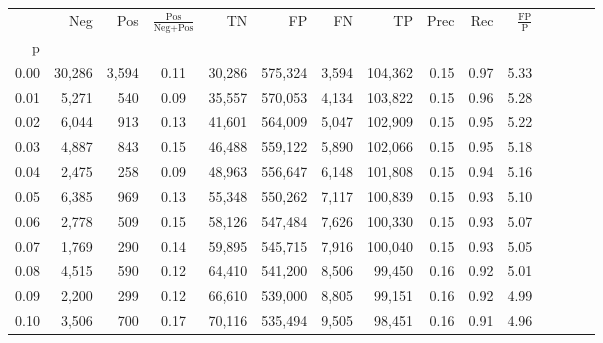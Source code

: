 \begin{tabular}{rrrcrrrrrrrrrrr}
\toprule
{} &     Neg &    Pos & $\frac{\text{Pos}}{\text{Neg}+\text{Pos}}$ &       TN &       FP &       FN &       TP &  Prec &   Rec & $\frac{\text{FP}}{\text{P}}$ \\
p    &         &        &                                            &          &          &          &          &       &       &                              \\
\midrule
0.00 &  30,286 &  3,594 &                                       0.11 &   30,286 &  575,324 &    3,594 &  104,362 &  0.15 &  0.97 &                         5.33 \\
0.01 &   5,271 &    540 &                                       0.09 &   35,557 &  570,053 &    4,134 &  103,822 &  0.15 &  0.96 &                         5.28 \\
0.02 &   6,044 &    913 &                                       0.13 &   41,601 &  564,009 &    5,047 &  102,909 &  0.15 &  0.95 &                         5.22 \\
0.03 &   4,887 &    843 &                                       0.15 &   46,488 &  559,122 &    5,890 &  102,066 &  0.15 &  0.95 &                         5.18 \\
0.04 &   2,475 &    258 &                                       0.09 &   48,963 &  556,647 &    6,148 &  101,808 &  0.15 &  0.94 &                         5.16 \\
0.05 &   6,385 &    969 &                                       0.13 &   55,348 &  550,262 &    7,117 &  100,839 &  0.15 &  0.93 &                         5.10 \\
0.06 &   2,778 &    509 &                                       0.15 &   58,126 &  547,484 &    7,626 &  100,330 &  0.15 &  0.93 &                         5.07 \\
0.07 &   1,769 &    290 &                                       0.14 &   59,895 &  545,715 &    7,916 &  100,040 &  0.15 &  0.93 &                         5.05 \\
0.08 &   4,515 &    590 &                                       0.12 &   64,410 &  541,200 &    8,506 &   99,450 &  0.16 &  0.92 &                         5.01 \\
0.09 &   2,200 &    299 &                                       0.12 &   66,610 &  539,000 &    8,805 &   99,151 &  0.16 &  0.92 &                         4.99 \\
0.10 &   3,506 &    700 &                                       0.17 &   70,116 &  535,494 &    9,505 &   98,451 &  0.16 &  0.91 &                         4.96 \\

\end{tabular}

